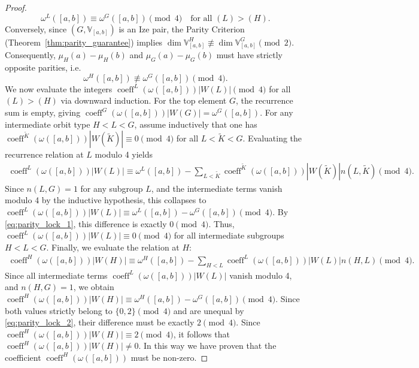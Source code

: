 \documentclass[10pt,a4paper]{amsart}
\def\wt{\widetilde}
\begin{document}
\begin{proof}
\begin{equation}\label{eq:parity_lock_1}
    \omega^L([a,b]) \equiv \omega^G([a,b]) \pmod 4 \quad \text{for all } (L) > (H).
\end{equation}
Conversely, since $(G, \mathbb V_{[a,b]})$ is an Ize pair, the Parity Criterion (Theorem~\ref{thm:parity_guarantee}) implies $\dim \mathbb V_{[a,b]}^H \not\equiv \dim \mathbb V_{[a,b]}^G \pmod 2$. Consequently, $\mu_H(a) - \mu_H(b)$ and $\mu_G(a) - \mu_G(b)$ must have strictly opposite parities, i.e.
\begin{equation}\label{eq:parity_lock_2}
    \omega^H([a,b]) \not\equiv \omega^G([a,b]) \pmod 4.
\end{equation}
We now evaluate the integers $\operatorname{coeff}^L ( \omega([a,b]) ) |W(L)| \pmod 4$ for all $(L) > (H)$ via downward induction. For the top element $G$, the recurrence sum is empty, giving $\operatorname{coeff}^G ( \omega([a,b]) ) |W(G)| = \omega^G([a,b])$. For any intermediate orbit type $H < L < G$, assume inductively that one has $\operatorname{coeff}^{\wt K} ( \omega([a,b]) ) |W(\tilde K)| \equiv 0 \pmod 4$ for all $L < \tilde K < G$. Evaluating the recurrence relation at $L$ modulo 4 yields
\begin{align*}
 \operatorname{coeff}^L ( \omega([a,b]) )|W(L)|  \equiv \omega^L([a,b]) - \sum_{L < \tilde K} \operatorname{coeff}^{\wt K} ( \omega([a,b]) ) |W(\tilde K)| n(L, \tilde K) \pmod 4.    
\end{align*}
Since $n(L,G) = 1$ for any subgroup $L$, and the intermediate terms vanish modulo 4 by the inductive hypothesis, this collapses to $\operatorname{coeff}^L ( \omega([a,b]) ) |W(L)| \equiv \omega^L([a,b]) - \omega^G([a,b]) \pmod 4$. By \eqref{eq:parity_lock_1}, this difference is exactly $0 \pmod 4$. Thus, $\operatorname{coeff}^L ( \omega([a,b]) ) |W(L)| \equiv 0 \pmod 4$ for all intermediate subgroups $H < L < G$.
Finally, we evaluate the relation at $H$:
\begin{align*}
\operatorname{coeff}^H ( \omega([a,b]) ) |W(H)| \equiv \omega^H([a,b]) - \sum_{H < L} \operatorname{coeff}^L ( \omega([a,b]) ) |W(L)| n(H,L) \pmod 4.    
\end{align*}
Since all intermediate terms $\operatorname{coeff}^L ( \omega([a,b]) ) |W(L)|$ vanish modulo 4, and $n(H,G) = 1$, we obtain $\operatorname{coeff}^H ( \omega([a,b]) ) |W(H)| \equiv \omega^H([a,b]) - \omega^G([a,b]) \pmod 4$. Since both values strictly belong to $\{0, 2\} \pmod 4$ and are unequal by \eqref{eq:parity_lock_2}, their difference must be exactly $2 \pmod 4$. Since $\operatorname{coeff}^H ( \omega([a,b]) ) |W(H)| \equiv 2 \pmod 4$, it follows that $\operatorname{coeff}^H ( \omega([a,b]) ) |W(H)| \neq 0$. In this way we have proven that the coefficient $\operatorname{coeff}^H(\omega([a,b]))$ must be non-zero.
\end{proof}
\end{document}
